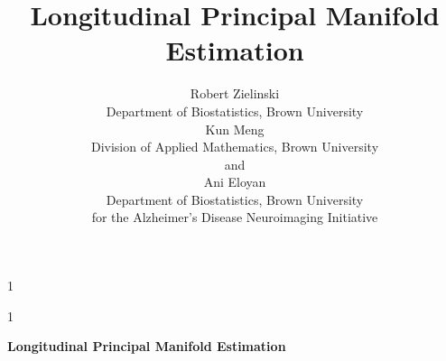 \documentclass[12pt]{article}
\newcommand{\blind}{1}
\theoremstyle{definition}
\begin{document}
\def\spacingset#1{\renewcommand{\baselinestretch}%
{#1}\small\normalsize} \spacingset{1}



\blind
{
  \title{\bf Longitudinal Principal Manifold Estimation}
  \author{
    Robert Zielinski\hspace{.2cm}\\
    Department of Biostatistics, Brown University\\
    Kun Meng \\
    Division of Applied Mathematics, Brown University\\
    and \\
    Ani Eloyan \\
    Department of Biostatistics, Brown University\\
    for the Alzheimer's Disease Neuroimaging Initiative}
  \maketitle
} \fi

\blind
{
  \bigskip
  \bigskip
  \bigskip
  \begin{center}
    {\LARGE\bf Longitudinal Principal Manifold Estimation}
\end{center}
  \medskip
} \fi
\end{document}
